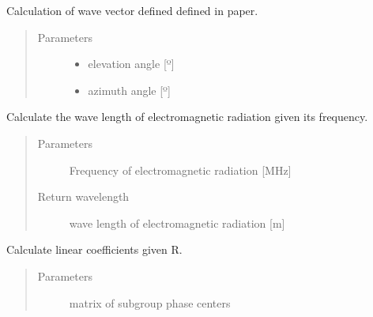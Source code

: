 \documentclass[letterpaper,12pt,english]{sphinxmanual}
\begin{document}
\begin{fulllineitems}
\label{\detokenize{functions:functions.k0_cal}}
Calculation of wave vector defined defined in paper.
\begin{quote}\begin{description}
\item[{Parameters}] \leavevmode\begin{itemize}
\item {} 
 \textendash{} elevation angle {[}º{]}

\item {} 
 \textendash{} azimuth angle {[}º{]}

\end{itemize}

\end{description}\end{quote}

\end{fulllineitems}


\begin{fulllineitems}
\label{\detokenize{functions:functions.lambda_cal}}
Calculate the wave length of electromagnetic radiation given its frequency.
\begin{quote}\begin{description}
\item[{Parameters}] \leavevmode
{} \textendash{} Frequency of electromagnetic radiation {[}MHz{]}

\item[{Return wavelength}] \leavevmode
wave length of electromagnetic radiation {[}m{]}

\end{description}\end{quote}

\end{fulllineitems}


\begin{fulllineitems}
\label{\detokenize{functions:functions.linCoeff_cal}}
Calculate linear coefficients given R.
\begin{quote}\begin{description}
\item[{Parameters}] \leavevmode
{} \textendash{} matrix of subgroup phase centers

\end{description}\end{quote}

\end{fulllineitems}
\end{document}
